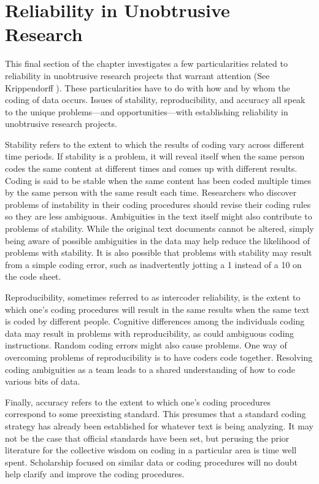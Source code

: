 \section{Reliability in Unobtrusive Research}

This final section of the chapter investigates a few particularities related to reliability in unobtrusive research projects that warrant attention (See Krippendorff \cite{krippendorff2009testing}). These particularities have to do with how and by whom the coding of data occurs. Issues of stability, reproducibility, and accuracy all speak to the unique problems---and opportunities---with establishing reliability in unobtrusive research projects.

Stability refers to the extent to which the results of coding vary across different time periods. If stability is a problem, it will reveal itself when the same person codes the same content at different times and comes up with different results. Coding is said to be stable when the same content has been coded multiple times by the same person with the same result each time. Researchers who discover problems of instability in their coding procedures should revise their coding rules so they are less ambiguous. Ambiguities in the text itself might also contribute to problems of stability. While the original text documents cannot be altered, simply being aware of possible ambiguities in the data may help reduce the likelihood of problems with stability. It is also possible that problems with stability may result from a simple coding error, such as inadvertently jotting a 1 instead of a 10 on the code sheet.

Reproducibility, sometimes referred to as intercoder reliability, is the extent to which one's coding procedures will result in the same results when the same text is coded by different people. Cognitive differences among the individuals coding data may result in problems with reproducibility, as could ambiguous coding instructions. Random coding errors might also cause problems. One way of overcoming problems of reproducibility is to have coders code together. Resolving coding ambiguities as a team leads to a shared understanding of how to code various bits of data.

Finally, accuracy refers to the extent to which one's coding procedures correspond to some preexisting standard. This presumes that a standard coding strategy has already been established for whatever text is being analyzing. It may not be the case that official standards have been set, but perusing the prior literature for the collective wisdom on coding in a particular area is time well spent. Scholarship focused on similar data or coding procedures will no doubt help clarify and improve the coding procedures.

